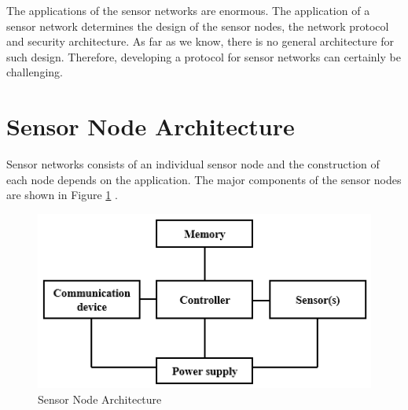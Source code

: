	The applications of the sensor networks are enormous. 
	The application of a sensor network determines the design of the sensor nodes, the network protocol and security architecture.
	As far as we know, there is no general architecture for such design.
	Therefore, developing a protocol for sensor networks can certainly be challenging. 

\section{Sensor Node Architecture}
	Sensor networks consists of an individual sensor node and the construction of each node depends on the application.
	The major components of the sensor nodes are shown in Figure \ref{fig:sensor-node-architecture} \cite{karl2007protocols}.
	\begin{figure}[h!]
		\centering
		\includegraphics{images/sensor-node-architecture.png}
		\caption{Sensor Node Architecture}
		\label{fig:sensor-node-architecture}
	\end{figure}

